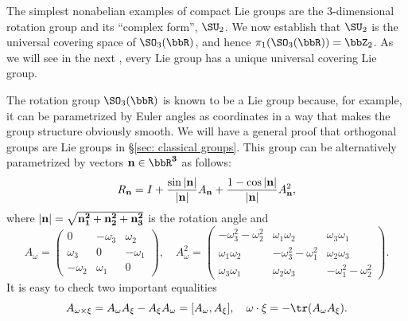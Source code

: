 The simplest nonabelian examples of compact Lie groups are the 3-dimensional rotation group and its ``complex form'', $\SU_2$. We now establish that $\SU_2$ is the universal covering space of $\SO_3(\bbR)$, and hence $\pi_1(\SO_3(\bbR))=\bbZ_2$. As we will see in the next \sect, every Lie group has a unique universal covering Lie group.

\begin{example}\label{example su2 and so3}
    The rotation group $\SO_3(\bbR)$ is known to be a Lie group because, for example, it can be parametrized by Euler angles as coordinates in a way that makes the group structure obviously smooth. We will have a general proof that orthogonal groups are Lie groups in \S\ref{sec: classical groups}. This group can be alternatively parametrized by vectors $\bf{n}\in\bbR^3$ as follows:
    \[R_{\bf{n}}=I+\frac{\sin |\bf{n}|}{|\bf{n}|}A_{\bf{n}}+\frac{1-\cos |\bf{n}|}{|\bf{n}|}A_{\bf{n}}^2,\]
    where $|\bf{n}|=\sqrt{n_1^2+n_2^2+n_3^2}$ is the rotation angle and 
    \[A_\omega=\begin{pmatrix}
        0&-\omega_3&\omega_2\\
        \omega_3&0&-\omega_1\\
        -\omega_2&\omega_1&0
    \end{pmatrix},\quad 
    A^2_\omega=\begin{pmatrix}
        -\omega_3^2-\omega_2^2 &\omega_1\omega_2 &\omega_3\omega_1\\
        \omega_1\omega_2& -\omega_3^2-\omega_1^2 & \omega_2\omega_3\\
        \omega_3\omega_1 & \omega_2\omega_3 & -\omega_1^2-\omega_2^2
    \end{pmatrix}
    .\]
    It is easy to check two important equalities 
    \[A_{\omega\times \xi}=A_\omega A_\xi-A_\xi A_\omega=[A_\omega,A_\xi],\quad \omega\cdot\xi=-\tr(A_\omega A_\xi).\label{eq R3->so(3) hom}\]

\end{example}
